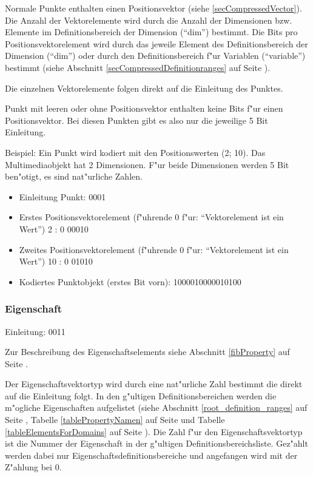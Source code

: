 Normale Punkte enthalten einen Positionsvektor (siehe \ref{secCompressedVector}). Die Anzahl der Vektorelemente wird durch die Anzahl der Dimensionen bzw. Elemente im Definitionsbereich der Dimension (``dim'') bestimmt. Die Bits pro Positionsvektorelement wird durch das jeweile Element des Definitionsbereich der Dimension (``dim'') oder durch den Definitionsbereich f"ur Variablen (``variable'') bestimmt (siehe Abschnitt \ref{secCompressedDefinitionranges} auf Seite \pageref{secCompressedDefinitionranges}).

Die einzelnen Vektorelemente folgen direkt auf die Einleitung des Punktes.

Punkt mit leeren oder ohne Positionsvektor enthalten keine Bits f"ur einen Positionsvektor. Bei diesen Punkten gibt es also nur die jeweilige 5 Bit Einleitung.

\bigskip\noindent
Beispiel: Ein Punkt wird kodiert mit den Positionswerten (2; 10). Das Multimediaobjekt hat 2 Dimensionen. F"ur beide Dimensionen werden 5 Bit ben"otigt, es sind nat"urliche Zahlen.
\begin{itemize}
 \item Einleitung Punkt: 0001
 \item Erstes Positionsvektorelement (f"uhrende 0 f"ur: ``Vektorelement ist ein Wert'') 2 : 0 00010
 \item Zweites Positionsvektorelement (f"uhrende 0 f"ur: ``Vektorelement ist ein Wert'') 10 : 0 01010
 \item Kodiertes Punktobjekt (erstes Bit vorn): 1000010000010100
\end{itemize}



\subsubsection{Eigenschaft}
\label{secCompressedProperty}

Einleitung: 0011

\bigskip\noindent
Zur Beschreibung des Eigenschaftselements siehe Abschnitt \ref{fibProperty} auf Seite \pageref{fibProperty} .

Der Eigenschaftsvektortyp wird durch eine nat"urliche Zahl bestimmt die direkt auf die Einleitung folgt. In den g"ultigen Definitionsbereichen werden die m"ogliche Eigenschaften aufgelistet (siehe Abschnitt \ref{root_definition_ranges} auf Seite \pageref{root_definition_ranges}, Tabelle \ref{tablePropertyNamen} auf Seite \pageref{tablePropertyNamen} und Tabelle \ref{tableElementsForDomains} auf Seite \pageref{tableElementsForDomains}). Die Zahl f"ur den Eigenschaftsvektortyp ist die Nummer der Eigenschaft in der g"ultigen Definitionsbereichsliste. Gez"ahlt werden dabei nur Eigenschaftsdefinitionsbereiche und angefangen wird mit der Z"ahlung bei 0.

